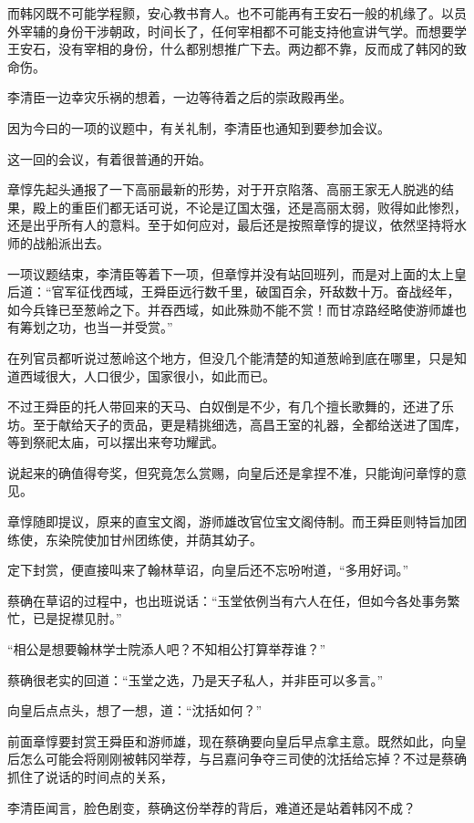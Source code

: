 而韩冈既不可能学程颢，安心教书育人。也不可能再有王安石一般的机缘了。以员外宰辅的身份干涉朝政，时间长了，任何宰相都不可能支持他宣讲气学。而想要学王安石，没有宰相的身份，什么都别想推广下去。两边都不靠，反而成了韩冈的致命伤。

李清臣一边幸灾乐祸的想着，一边等待着之后的崇政殿再坐。

因为今曰的一项的议题中，有关礼制，李清臣也通知到要参加会议。

这一回的会议，有着很普通的开始。

章惇先起头通报了一下高丽最新的形势，对于开京陷落、高丽王家无人脱逃的结果，殿上的重臣们都无话可说，不论是辽国太强，还是高丽太弱，败得如此惨烈，还是出乎所有人的意料。至于如何应对，最后还是按照章惇的提议，依然坚持将水师的战船派出去。

一项议题结束，李清臣等着下一项，但章惇并没有站回班列，而是对上面的太上皇后道：“官军征伐西域，王舜臣远行数千里，破国百余，歼敌数十万。奋战经年，如今兵锋已至葱岭之下。并吞西域，如此殊勋不能不赏！而甘凉路经略使游师雄也有筹划之功，也当一并受赏。”

在列官员都听说过葱岭这个地方，但没几个能清楚的知道葱岭到底在哪里，只是知道西域很大，人口很少，国家很小，如此而已。

不过王舜臣的托人带回来的天马、白奴倒是不少，有几个擅长歌舞的，还进了乐坊。至于献给天子的贡品，更是精挑细选，高昌王室的礼器，全都给送进了国库，等到祭祀太庙，可以摆出来夸功耀武。

说起来的确值得夸奖，但究竟怎么赏赐，向皇后还是拿捏不准，只能询问章惇的意见。

章惇随即提议，原来的直宝文阁，游师雄改官位宝文阁侍制。而王舜臣则特旨加团练使，东染院使加甘州团练使，并荫其幼子。

定下封赏，便直接叫来了翰林草诏，向皇后还不忘吩咐道，“多用好词。”

蔡确在草诏的过程中，也出班说话：“玉堂依例当有六人在任，但如今各处事务繁忙，已是捉襟见肘。”

“相公是想要翰林学士院添人吧？不知相公打算举荐谁？”

蔡确很老实的回道：“玉堂之选，乃是天子私人，并非臣可以多言。”

向皇后点点头，想了一想，道：“沈括如何？”

前面章惇要封赏王舜臣和游师雄，现在蔡确要向皇后早点拿主意。既然如此，向皇后怎么可能会将刚刚被韩冈举荐，与吕嘉问争夺三司使的沈括给忘掉？不过是蔡确抓住了说话的时间点的关系，

李清臣闻言，脸色剧变，蔡确这份举荐的背后，难道还是站着韩冈不成？

